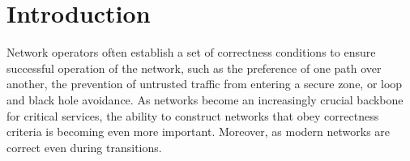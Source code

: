 \section{Introduction}
\label{sec:intro}



Network operators often establish a set of correctness conditions to ensure 
successful operation of the network, such as
the preference of one path over another, the prevention of untrusted traffic
from entering a secure zone,
or loop and black hole avoidance. As networks become an increasingly crucial backbone for
critical services,
the ability to construct networks that obey correctness criteria is becoming
even more important. 
Moreover, as modern networks are  correct even during transitions.

